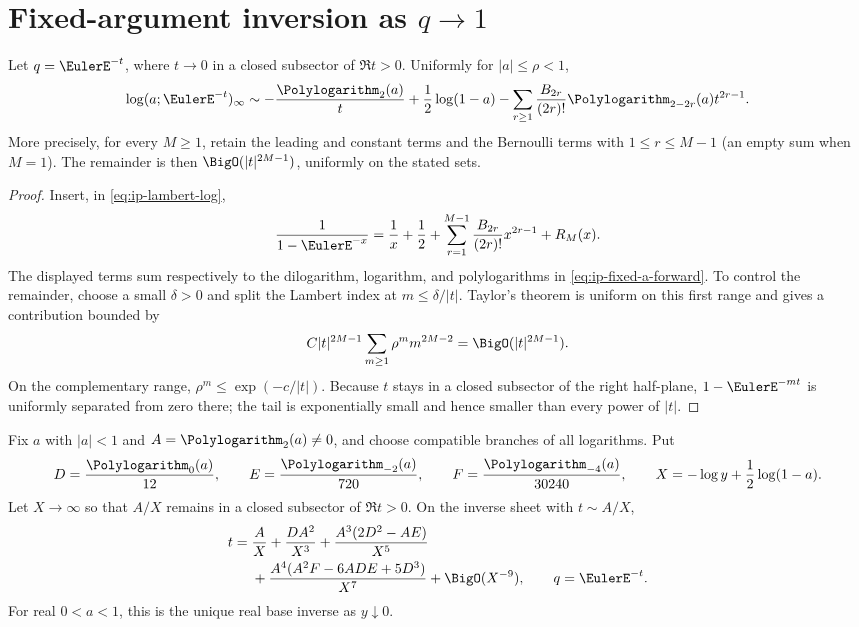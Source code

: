 \section{\texorpdfstring{Fixed-argument inversion as \(q\to1\)}{Fixed-argument inversion as q approaches 1}}
\label{sec:ip-fixed-a-qone}

\begin{theorem}
\label{thm:ip-fixed-a-expansion}
Let \(q=\EulerE^{-t}\), where \(t\to0\) in a closed subsector of
\(\Re t>0\).  Uniformly for \(|a|\leq\rho<1\),
\begin{equation}
 \log(a;\EulerE^{-t})_\infty
 \sim-\frac{\Polylogarithm_2(a)}t+\frac12\log(1-a)
 -\sum_{r\geq1}\frac{B_{2r}}{(2r)!}
 \Polylogarithm_{2-2r}(a)t^{2r-1}.
 \label{eq:ip-fixed-a-forward}
\end{equation}
More precisely, for every \(M\geq1\), retain the leading and constant terms
and the Bernoulli terms with \(1\leq r\leq M-1\) (an empty sum when \(M=1\)).
The remainder is then \(\BigO(|t|^{2M-1})\), uniformly on the stated sets.
\end{theorem}

\begin{proof}
Insert, in \cref{eq:ip-lambert-log},
\[
 \frac1{1-\EulerE^{-x}}=\frac1x+\frac12+
 \sum_{r=1}^{M-1}\frac{B_{2r}}{(2r)!}x^{2r-1}+R_M(x).
\]
The displayed terms sum respectively to the dilogarithm, logarithm, and
polylogarithms in \cref{eq:ip-fixed-a-forward}.  To control the remainder,
choose a small \(\delta>0\) and split the Lambert index at
\(m\leq\delta/|t|\).  Taylor's theorem is uniform on this first range and
gives a contribution bounded by
\[
 C|t|^{2M-1}\sum_{m\geq1}\rho^m m^{2M-2}
 =\BigO(|t|^{2M-1}).
\]
On the complementary range, \(\rho^m\leq
\exp(-c/|t|)\).  Because \(t\) stays in a closed subsector of the right
half-plane, \(1-\EulerE^{-mt}\) is uniformly separated from zero there; the tail
is exponentially small and hence smaller than every power of \(|t|\).
\end{proof}

\begin{theorem}
\label{thm:ip-fixed-a-inverse}
Fix \(a\) with \(|a|<1\) and \(A=\Polylogarithm_2(a)\ne0\), and choose compatible
branches of all logarithms.  Put
\[
 D=\frac{\Polylogarithm_0(a)}{12},\qquad
 E=\frac{\Polylogarithm_{-2}(a)}{720},\qquad
 F=\frac{\Polylogarithm_{-4}(a)}{30240},\qquad
 X=-\log y+\frac12\log(1-a).
\]
Let \(X\to\infty\) so that \(A/X\) remains in a closed subsector of
\(\Re t>0\).  On the inverse sheet with \(t\sim A/X\),
\begin{align}
 t={}&\frac AX+\frac{DA^2}{X^3}
 +\frac{A^3(2D^2-AE)}{X^5}\notag\\
 &+\frac{A^4(A^2F-6ADE+5D^3)}{X^7}
 +\BigO(X^{-9}),\qquad q=\EulerE^{-t}.
 \label{eq:ip-fixed-a-inverse}
\end{align}
For real \(0<a<1\), this is the unique real base inverse as \(y\downarrow0\).
\end{theorem}

